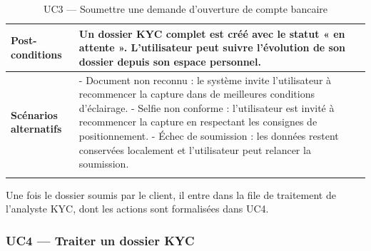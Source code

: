 \begin{longtable}{|>{\bfseries}p{3.8cm}|p{10.2cm}|}
  \hline
  Post-conditions      & Un dossier KYC complet est créé avec le statut « en attente ». L'utilisateur peut suivre l'évolution de son dossier depuis son espace personnel. \\
  \hline
  Scénarios alternatifs &
    - Document non reconnu : le système invite l'utilisateur à recommencer la capture dans de meilleures conditions d'éclairage. \newline
    - Selfie non conforme : l'utilisateur est invité à recommencer la capture en respectant les consignes de positionnement. \newline
    - Échec de soumission : les données restent conservées localement et l'utilisateur peut relancer la soumission. \\
  \hline
  \caption{UC3 --- Soumettre une demande d'ouverture de compte bancaire}
  \label{tab:uc3}
\end{longtable}

Une fois le dossier soumis par le client, il entre dans la file de traitement de l'analyste KYC, dont les actions sont formalisées dans UC4.

\subsubsection{UC4 --- Traiter un dossier KYC}

